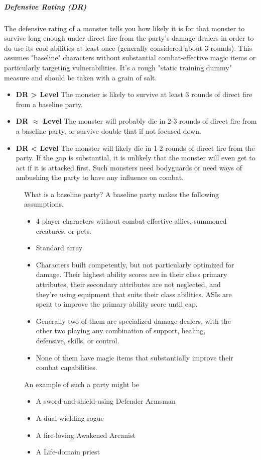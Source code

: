 \subparagraph*{Defensive Rating (DR)} The defensive rating of a monster tells you how likely it is for that monster to survive long enough under direct fire from the party's damage dealers in order to do use its cool abilities at least once (generally considered about 3 rounds). This assumes "baseline" characters without substantial combat-effective magic items or particularly targeting vulnerabilities. It's a rough "static training dummy" measure and should be taken with a grain of salt.

\begin{itemize}
	\item[] \textbf{DR > Level} The monster is likely to survive at least 3 rounds of direct fire from a baseline party.
	\item[] \textbf{DR $\approx$ Level} The monster will probably die in 2-3 rounds of direct fire from a baseline party, or survive double that if not focused down.
	\item[] \textbf{DR < Level} The monster will likely die in 1-2 rounds of direct fire from the party. If the gap is substantial, it is unlikely that the monster will even get to act if it is attacked first. Such monsters need bodyguards or need ways of ambushing the party to have any influence on combat.
\end{itemize}

\begin{figure}
	\begin{DndComment}{What is a baseline party?}
		A baseline party makes the following assumptions.
		\begin{itemize}
			\item 4 player characters without combat-effective allies, summoned creatures, or pets.
			\item Standard array
			\item Characters built competently, but not particularly optimized for damage. Their highest ability scores are in their class primary attributes, their secondary attributes are not neglected, and they're using equipment that suits their class abilities. ASIs are spent to improve the primary ability score until cap.
			\item Generally two of them are specialized damage dealers, with the other two playing any combination of support, healing, defensive, skills, or control.
			\item None of them have magic items that substantially improve their combat capabilities.
		\end{itemize}

		An example of such a party might be
		\begin{itemize}
			\item A sword-and-shield-using Defender Armsman
			\item A dual-wielding rogue
			\item A fire-loving Awakened Arcanist
			\item A Life-domain priest
		\end{itemize}
	\end{DndComment}
\end{figure}

